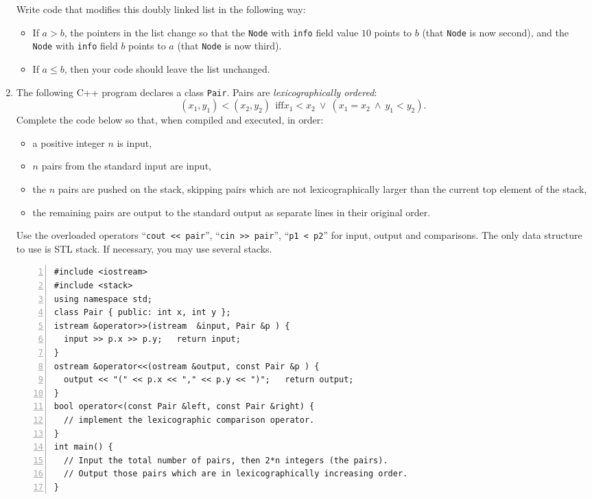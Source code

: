 \documentclass[a4paper,12pt]{article}
\begin{document}
\begin{enumerate}
Write code that modifies this doubly linked list in the following way:
\begin{itemize}
\item If $a > b$, the pointers in the list change so that the \texttt{Node} with \texttt{info} field value $10$ points to $b$ (that \texttt{Node} is now second), and the \texttt{Node} with \texttt{info} field $b$ points to $a$ (that \texttt{Node} is now third). 
\item If $a \leq b$, then your code should leave the list unchanged.
\end{itemize}

\vfill
\clearpage

\item \label{q:q4}

The following C++ program declares a class {\tt Pair}. 
Pairs are {\em lexicographically ordered}: 
\[
(x_1, y_1) < (x_2, y_2)\ \ \text{iff} x_1 < x_2\ \vee\ (x_1 = x_2\ \wedge\ y_1 < y_2).
\]
Complete the code below so that, when compiled and executed, in order:
\begin{itemize}
\item a positive integer $n$ is input,
\item $n$ pairs from the standard input are input,
\item the $n$ pairs are pushed on the stack, skipping pairs which are not lexicographically larger than the current top element of the stack,
\item the remaining pairs are output to the standard output as separate lines in their original order.
\end{itemize}

Use the overloaded operators ``{\tt cout << pair}'', ``{\tt cin >> pair}'', ``{\tt p1 < p2}''
for input, output and comparisons. The only data structure to use is STL stack. 
If necessary, you may use several stacks.

\begin{Verbatim}[frame=single,numbers=left]
#include <iostream>
#include <stack>
using namespace std;
class Pair { public: int x, int y }; 
istream &operator>>(istream  &input, Pair &p ) { 
  input >> p.x >> p.y;   return input;            
}
ostream &operator<<(ostream &output, const Pair &p ) { 
  output << "(" << p.x << "," << p.y << ")";   return output;            
}
bool operator<(const Pair &left, const Pair &right) {
  // implement the lexicographic comparison operator.
}
int main() {
  // Input the total number of pairs, then 2*n integers (the pairs). 
  // Output those pairs which are in lexicographically increasing order.
}
\end{Verbatim}


\end{enumerate}
\end{document}
